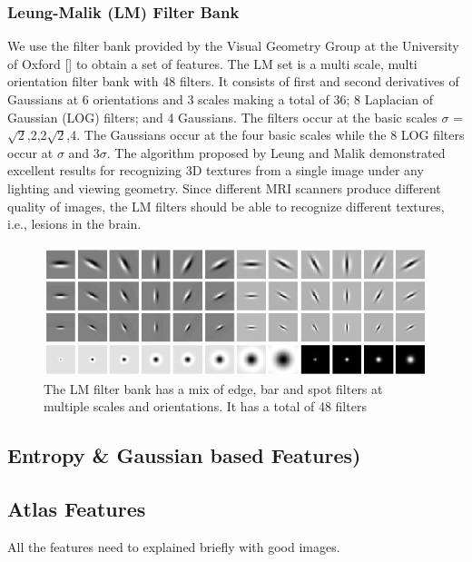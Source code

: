 \documentclass{article} %
\begin{document}
\subsubsection{Leung-Malik (LM) Filter Bank}
We use the filter bank provided by the Visual Geometry Group at the University of Oxford [] to obtain a set of features. The LM set is a multi scale, multi orientation filter bank with 48 filters. It consists of first and second derivatives of Gaussians at 6 orientations and 3 scales making a total of 36; 8 Laplacian of Gaussian (LOG) filters; and 4 Gaussians. The filters occur at the basic scales $\sigma$ = {$\sqrt{2}$,2,2$\sqrt{2}$,4}. The Gaussians occur at the four basic scales while the 8 LOG filters occur at $\sigma$ and 3$\sigma$. The algorithm proposed by Leung and Malik \cite{LMfilters} demonstrated excellent
results for recognizing 3D textures from a single image under any lighting and viewing geometry. Since different MRI scanners produce different quality of images, the LM filters should be able to recognize different textures, i.e., lesions in the brain.
\begin{figure}[h]
\centering
\includegraphics[scale=0.4]{lmfilters.jpg}
\caption{The LM filter bank has a mix of edge, bar and spot filters at multiple scales and orientations. It has a total of 48 filters}
\label{fig:LM filters}
\end{figure}

\subsection{Entropy \& Gaussian based Features)}

\subsection{Atlas Features}

All the features need to explained briefly with good images.

\end{document}
